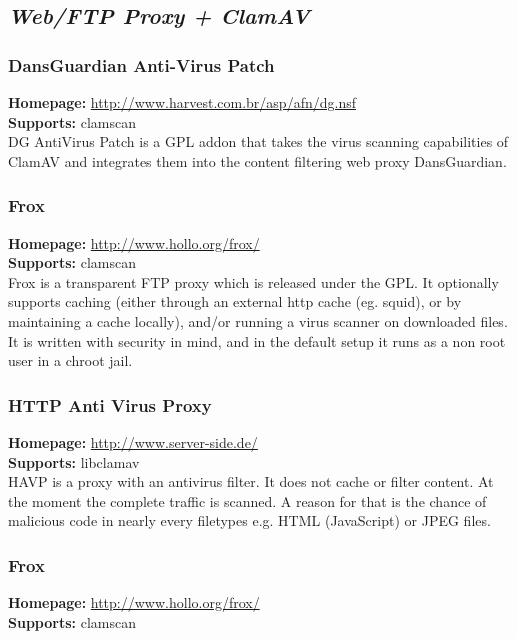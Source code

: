 \documentclass[a4paper,titlepage,12pt]{article}
\begin{document}
    \subsection{\emph{Web/FTP Proxy + ClamAV}}

    \subsubsection{DansGuardian Anti-Virus Patch}
    \textbf{Homepage:} \url{http://www.harvest.com.br/asp/afn/dg.nsf}\\
    \textbf{Supports:} clamscan\\[4pt]
    DG AntiVirus Patch is a GPL addon that takes the virus scanning
    capabilities of ClamAV and integrates them into the content filtering
    web proxy DansGuardian.

    \subsubsection{Frox}
    \textbf{Homepage:} \url{http://www.hollo.org/frox/}\\
    \textbf{Supports:} clamscan\\[4pt]
    Frox is a transparent FTP proxy which is released under the GPL. It
    optionally supports caching (either through an external http cache
    (eg. squid), or by maintaining a cache locally), and/or running a virus
    scanner on downloaded files. It is written with security in mind, and in
    the default setup it runs as a non root user in a chroot jail.

    \subsubsection{HTTP Anti Virus Proxy}
    \textbf{Homepage:} \url{http://www.server-side.de/}\\
    \textbf{Supports:} libclamav\\[4pt]
    HAVP is a proxy with an antivirus filter. It does not cache or filter
    content. At the moment the complete traffic is scanned. A reason for that
    is the chance of malicious code in nearly every filetypes e.g. HTML
    (JavaScript) or JPEG files.

    \subsubsection{Frox}
    \textbf{Homepage:} \url{http://www.hollo.org/frox/}\\
    \textbf{Supports:} clamscan\\[4pt]
\end{document}
